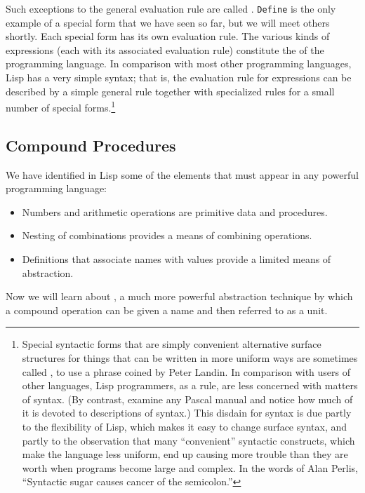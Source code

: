 Such exceptions to the general evaluation rule are called
.  \texttt{Define} is the only example of a
special form that we have seen so far, but we will meet others
shortly.  Each special form has its own evaluation rule. The various
kinds of expressions (each with its associated evaluation rule)
constitute the  of the programming language.  In
comparison with most other programming languages, Lisp has a very
simple syntax; that is, the evaluation rule for expressions can be
described by a simple general rule together with specialized rules for
a small number of special forms.\footnote{Special syntactic forms that
  are simply convenient alternative surface structures for things that
  can be written in more uniform ways are sometimes called
  , to use a phrase coined by Peter Landin.  In
  comparison with users of other languages, Lisp programmers, as a
  rule, are less concerned with matters of syntax.  (By contrast,
  examine any Pascal manual and notice how much of it is devoted to
  descriptions of syntax.)  This disdain for syntax is due partly to
  the flexibility of Lisp, which makes it easy to change surface
  syntax, and partly to the observation that many ``convenient''
  syntactic constructs, which make the language less uniform, end up
  causing more trouble than they are worth when programs become large
  and complex.  In the words of Alan Perlis, ``Syntactic sugar causes
  cancer of the semicolon.''}

\subsection{Compound Procedures}
\label{sec:1.1.4}

We have identified in Lisp some of the elements that must appear in
any powerful programming language:

\begin{itemize}
\item Numbers and arithmetic operations are 
primitive data and procedures.
\item Nesting of combinations provides a means of 
combining operations.
\item Definitions that associate names with values provide a
limited means of abstraction.
\end{itemize}

Now we will learn about
, a much more powerful abstraction
technique by which a compound operation can be given a name and then
referred to as a unit.


